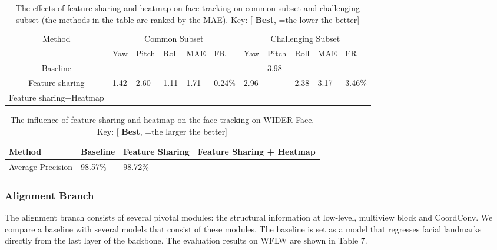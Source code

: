 \documentclass[3p,twocolumn, round, sort & compress]{elsarticle}
\begin{document}
\begin{table*}[t!]
	\centering
	\begin{tabular}{c|m{0.6cm}<{\centering}m{0.7cm}<{\centering}m{0.6cm}<{\centering}m{0.7cm}<{\centering}m{1.2cm}<{\centering}|m{0.6cm}<{\centering}m{0.7cm}<{\centering}m{0.6cm}<{\centering}m{0.7cm}<{\centering}m{1.2cm}<{\centering}}
		\hline
		\multirow{2}{*}{Method} & \multicolumn{5}{c|}{Common Subset}   & \multicolumn{5}{c}{Challenging Subset}  \\ \cline{2-11} 
		& Yaw  & Pitch & Roll & MAE  & FR   & Yaw   & Pitch & Roll  & MAE   & FR   \\ \hline
		Baseline                    &  &   &  &  &   &   & 3.98  &   &   &   \\
		Feature sharing & 1.42 & 2.60  & 1.11 & 1.71 & 0.24\%  & 2.96  &   & 2.38  & 3.17  & 3.46\%  \\
		Feature sharing+Heatmap    & {\color{red} \textbf{}} & {\color{red} \textbf{}}  & {\color{red} \textbf{}} & {\color{red} \textbf{}} & {\color{red} \textbf{}} & {\color{red} \textbf{}} & {\color{red} \textbf{}} & {\color{red} \textbf{}} & {\color{red} \textbf{}} & {\color{red} \textbf{}} \\ \hline
	\end{tabular}
	\caption{The effects of feature sharing and heatmap on face tracking on common subset and challenging subset (the methods in the table are ranked by the MAE). Key: [{\color{red} \textbf{Best}}, =the lower the better]}
	\label{Tabal9}
\end{table*}

\begin{table}[t!]
	\centering
	\begin{tabular}{m{1.6cm}<{\centering}|m{1.1cm}<{\centering}m{1.1cm}<{\centering}m{2.3cm}<{\centering}}
		\hline
		Method  & Baseline & Feature Sharing & Feature Sharing + Heatmap \\ \hline
		Average Precision  & 98.57\%  & 98.72\% & {\color{red} \textbf{}} \\ \hline
	\end{tabular}
	\caption{The influence of feature sharing and heatmap on the face tracking on WIDER Face. Key: [{\color{red} \textbf{Best}}, =the larger the better]}
	\label{Tabal8}
\end{table}

\subsubsection{Alignment Branch}
The alignment branch consists of several pivotal modules: the structural information at low-level, multiview block and CoordConv. We compare a baseline with several models that consist of these modules. The baseline is set as a model that regresses facial landmarks directly from the last layer of the backbone. The evaluation results on WFLW are shown in Table 7.
\end{document}
